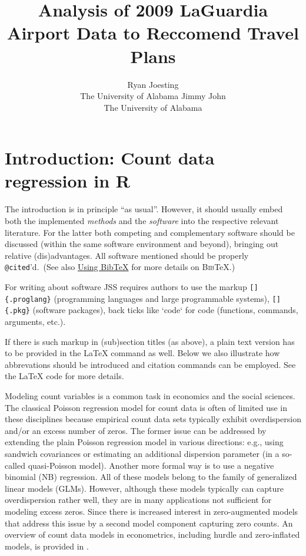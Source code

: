 \documentclass[
  nojss,
  article]{jss}
\author{Ryan Joesting\\The University of Alabama \And Jimmy John\\The
University of Alabama}
\title{Analysis of 2009 LaGuardia Airport Data to Reccomend Travel
Plans}
\begin{document}
\maketitle


\section{Introduction: Count data regression in R}\label{sec-intro}

\begin{tcolorbox}[enhanced jigsaw, bottomrule=.15mm, breakable, toprule=.15mm, opacityback=0, colframe=quarto-callout-color-frame, left=2mm, rightrule=.15mm, arc=.35mm, leftrule=.75mm, colback=white]

The introduction is in principle ``as usual''. However, it should
usually embed both the implemented \emph{methods} and the
\emph{software} into the respective relevant literature. For the latter
both competing and complementary software should be discussed (within
the same software environment and beyond), bringing out relative
(dis)advantages. All software mentioned should be properly
\texttt{@cited}'d.~(See also \hyperref[sec-bibtex]{Using BibTeX} for
more details on \textsc{Bib}{\TeX}.)

For writing about software JSS requires authors to use the markup
\texttt{{[}{]}\{.proglang\}} (programming languages and large
programmable systems), \texttt{{[}{]}\{.pkg\}} (software packages), back
ticks like `code` for code (functions, commands, arguments, etc.).

If there is such markup in (sub)section titles (as above), a plain text
version has to be provided in the {\LaTeX} command as well. Below we
also illustrate how abbrevations should be introduced and citation
commands can be employed. See the {\LaTeX} code for more details.

\end{tcolorbox}

Modeling count variables is a common task in economics and the social
sciences. The classical Poisson regression model for count data is often
of limited use in these disciplines because empirical count data sets
typically exhibit overdispersion and/or an excess number of zeros. The
former issue can be addressed by extending the plain Poisson regression
model in various directions: e.g., using sandwich covariances or
estimating an additional dispersion parameter (in a so-called
quasi-Poisson model). Another more formal way is to use a negative
binomial (NB) regression. All of these models belong to the family of
generalized linear models (GLMs). However, although these models
typically can capture overdispersion rather well, they are in many
applications not sufficient for modeling excess zeros. Since
\citet{Mullahy1986} there is increased interest in zero-augmented models
that address this issue by a second model component capturing zero
counts. An overview of count data models in econometrics, including
hurdle and zero-inflated models, is provided in
\citet{CameronTrivedi2013}.
\end{document}
